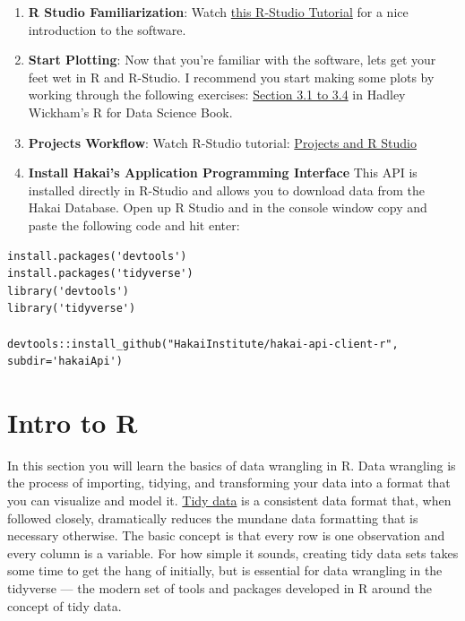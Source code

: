 \documentclass[]{book}
\begin{document}
\begin{enumerate}
\def\labelenumi{\arabic{enumi})}
\item
  \textbf{R Studio Familiarization}: Watch
  \href{https://www.rstudio.com/resources/webinars/rstudio-essentials-webinar-series-part-1/}{this
  R-Studio Tutorial} for a nice introduction to the software.
\item
  \textbf{Start Plotting}: Now that you're familiar with the software,
  lets get your feet wet in R and R-Studio. I recommend you start making
  some plots by working through the following exercises:
  \href{http://r4ds.had.co.nz/data-visualisation.html}{Section 3.1 to
  3.4} in Hadley Wickham's R for Data Science Book.
\item
  \textbf{Projects Workflow}: Watch R-Studio tutorial:
  \href{https://www.rstudio.com/resources/webinars/rstudio-essentials-webinar-series-managing-change-part-1/}{Projects
  and R Studio}
\item
  \textbf{Install Hakai's Application Programming Interface} This API is
  installed directly in R-Studio and allows you to download data from
  the Hakai Database. Open up R Studio and in the console window copy
  and paste the following code and hit enter:
\end{enumerate}

\begin{verbatim}
install.packages('devtools')
install.packages('tidyverse')
library('devtools')
library('tidyverse')

devtools::install_github("HakaiInstitute/hakai-api-client-r", subdir='hakaiApi')
\end{verbatim}

\chapter{Intro to R}\label{intro-to-r}

In this section you will learn the basics of data wrangling in R. Data
wrangling is the process of importing, tidying, and transforming your
data into a format that you can visualize and model it.
\href{http://vita.had.co.nz/papers/tidy-data.pdf}{Tidy data} is a
consistent data format that, when followed closely, dramatically reduces
the mundane data formatting that is necessary otherwise. The basic
concept is that every row is one observation and every column is a
variable. For how simple it sounds, creating tidy data sets takes some
time to get the hang of initially, but is essential for data wrangling
in the tidyverse --- the modern set of tools and packages developed in R
around the concept of tidy data.
\end{document}
